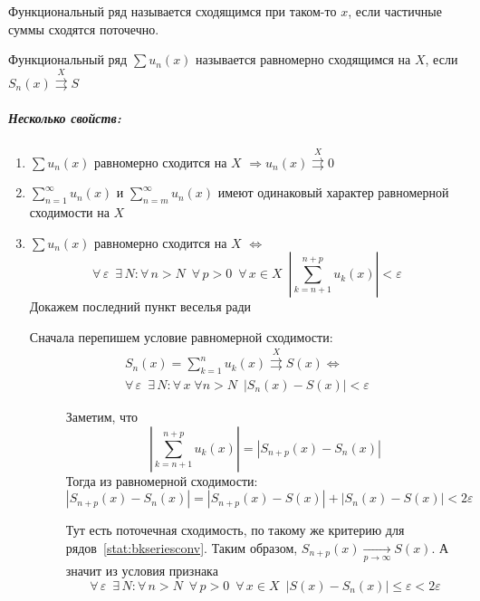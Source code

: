 \documentclass[12pt]{../../notes}
\begin{document}
\begin{defn}\label{defn:convfseries}
  Функциональный ряд называется сходящимся при таком-то $x$, если частичные суммы сходятся поточечно.
\end{defn}

\begin{defn}\label{defn:uniconvfseries}
  Функциональный ряд $\sum u_n(x)$ называется равномерно сходящимся на $X$, 
  если $S_n(x) \overset{X}{\rightrightarrows} S$
\end{defn}

\subparagraph{Несколько свойств:}
\begin{enumerate}
  \item $\sum u_n(x)$ равномерно сходится на $X$ $\Rightarrow u_n(x)\overset{X}{\rightrightarrows} 0 $
  \item $\sum_{n=1}^\infty u_n(x)$ и $\sum_{n=m}^\infty u_n(x)$ имеют одинаковый характер равномерной сходимости на
    $X$
  \item $\sum u_n(x)$ равномерно сходится на $X$ $\Leftrightarrow$
    \[
      \forall\, \varepsilon \;\: \exists\, N \colon \forall\, n > N \;\: \forall\, p > 0 \;\: \forall\, x\in X \;\:
      \left| \sum_{k=n+1}^{n+p} u_k (x) \right| < \varepsilon
    \]
    Докажем последний пункт веселья ради

    \begin{itlproof}
      Сначала перепишем условие равномерной сходимости:
      \[
        \begin{split}
          S_n(x) = \sum_{k=1}^n u_k(x) \overset{X}{\rightrightarrows} S(x) \Leftrightarrow \\
          \forall\, \varepsilon \;\: \exists\, N \colon \forall\, x \; \forall n > N \;\: |S_n(x)-S(x)| < \varepsilon
        \end{split}
      \]
      \begin{description}
        \item[\circlearound{$\Rightarrow$}] Заметим, что
          \[
            \left| \sum_{k=n+1}^{n+p} u_k(x) \right| = | S_{n+p}(x) - S_n(x) |
          \]
          Тогда из равномерной сходимости:
          \[
            | S_{n+p}(x) - S_n(x) | = |S_{n+p}(x) - S(x)| + |S_n(x) - S(x)| < 2\varepsilon
          \]
        \item[\circlearound{$\Leftarrow$}] Тут есть поточечная сходимость, 
          по такому же критерию для рядов~\ref{stat:bkseriesconv}.
          Таким образом, $S_{n+p}(x)\xrightarrow[p\to \infty]{} S(x)$.
          А значит из условия признака
          \[
            \forall\, \varepsilon \;\: \exists\, N \colon \forall\, n > N \;\: 
            \forall\, p > 0 \;\: \forall\, x\in X \;\:
            \left| S(x) - S_n(x) \right| \leqslant \varepsilon < 2\varepsilon
          \]
      \end{description}
    \end{itlproof}
\end{enumerate}
\end{document}
